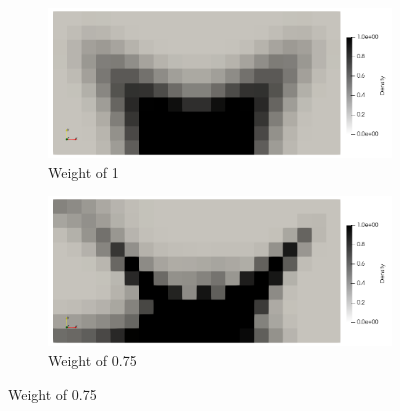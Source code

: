 \begin{figure}[ht]
    \centering
    \begin{subfigure}[b]{0.45\linewidth}
        \includegraphics[width=\linewidth]{figures/chapter_5/PC_MF_1to0.png}
        \caption{Weight of 1}
    \end{subfigure}
    \hfill
    \begin{subfigure}[b]{0.45\linewidth}
        \includegraphics[width=\linewidth]{figures/chapter_5/PC_MF_3to1.png}
        \caption{Weight of 0.75}
    \end{subfigure}
    

\end{figure}
